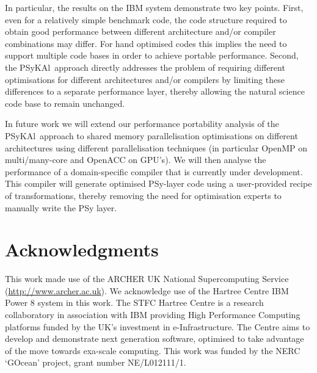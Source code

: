 \documentclass{IOS-Book-Article}
\newcommand{\psykal}{{PS}y{KA}l}
\begin{document}
In particular, the results on the IBM system demonstrate two key points.
%
First, even for a relatively simple
benchmark code, the code structure required to obtain good performance
between different architecture and/or compiler combinations may
differ. For hand optimised codes this implies the need to support
multiple code bases in order to achieve portable performance.
%
Second, the \psykal\ approach directly addresses the problem of
requiring different optimisations for different architectures and/or
compilers by limiting these differences to a separate performance
layer, thereby allowing the natural science code base to remain
unchanged.

In future work we will extend our performance portability analysis of
the \psykal\ approach to shared memory parallelisation optimisations on
different architectures using different parallelisation techniques (in
particular OpenMP on multi/many-core and OpenACC on GPU's).
%
We will then analyse the performance of a domain-specific compiler
that is currently under development. This compiler will generate
optimised PSy-layer code using a user-provided recipe of
transformations, thereby removing the need for optimisation experts to
manually write the PSy layer.

\section*{Acknowledgments}

This work made use of the ARCHER UK National Supercomputing Service
(\url{http://www.archer.ac.uk}). We acknowledge use of the Hartree
Centre IBM Power 8 system in this work. The STFC Hartree Centre is a
research collaboratory in association with IBM providing High
Performance Computing platforms funded by the UK's investment in
e-Infrastructure. The Centre aims to develop and demonstrate next
generation software, optimised to take advantage of the move towards
exa-scale computing. This work was funded by the NERC `GOcean' project,
grant number NE/L012111/1.



%
\end{document}
